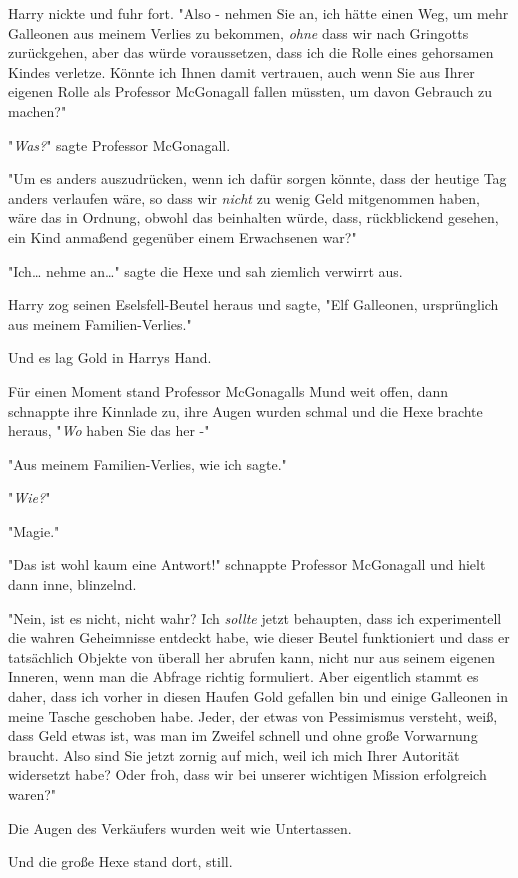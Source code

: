 {Harry nickte und fuhr fort. "Also - nehmen Sie an, ich hätte einen Weg, um mehr Galleonen aus meinem Verlies zu bekommen, \emph{ohne} dass wir nach Gringotts zurückgehen, aber das würde voraussetzen, dass ich die Rolle eines gehorsamen Kindes verletze. Könnte ich Ihnen damit vertrauen, auch wenn Sie aus Ihrer eigenen Rolle als Professor McGonagall fallen müssten, um davon Gebrauch zu machen?"

"\emph{Was?}" sagte Professor McGonagall.

"Um es anders auszudrücken, wenn ich dafür sorgen könnte, dass der heutige Tag anders verlaufen wäre, so dass wir \emph{nicht} zu wenig Geld mitgenommen haben, wäre das in Ordnung, obwohl das beinhalten würde, dass, rückblickend gesehen, ein Kind anmaßend gegenüber einem Erwachsenen war?"

"Ich… nehme an…" sagte die Hexe und sah ziemlich verwirrt aus.

Harry zog seinen Eselsfell-Beutel heraus und sagte, "Elf Galleonen, ursprünglich aus meinem Familien-Verlies."

Und es lag Gold in Harrys Hand.

Für einen Moment stand Professor McGonagalls Mund weit offen, dann schnappte ihre Kinnlade zu, ihre Augen wurden schmal und die Hexe brachte heraus, "\emph{Wo} haben Sie das her -"

"Aus meinem Familien-Verlies, wie ich sagte."

"\emph{Wie?}"

"Magie."

"Das ist wohl kaum eine Antwort!" schnappte Professor McGonagall und hielt dann inne, blinzelnd.

"Nein, ist es nicht, nicht wahr? Ich \emph{sollte} jetzt behaupten, dass ich experimentell die wahren Geheimnisse entdeckt habe, wie dieser Beutel funktioniert und dass er tatsächlich Objekte von überall her abrufen kann, nicht nur aus seinem eigenen Inneren, wenn man die Abfrage richtig formuliert. Aber eigentlich stammt es daher, dass ich vorher in diesen Haufen Gold gefallen bin und einige Galleonen in meine Tasche geschoben habe. Jeder, der etwas von Pessimismus versteht, weiß, dass Geld etwas ist, was man im Zweifel schnell und ohne große Vorwarnung braucht. Also sind Sie jetzt zornig auf mich, weil ich mich Ihrer Autorität widersetzt habe? Oder froh, dass wir bei unserer wichtigen Mission erfolgreich waren?"

Die Augen des Verkäufers wurden weit wie Untertassen.

Und die große Hexe stand dort, still.

}
